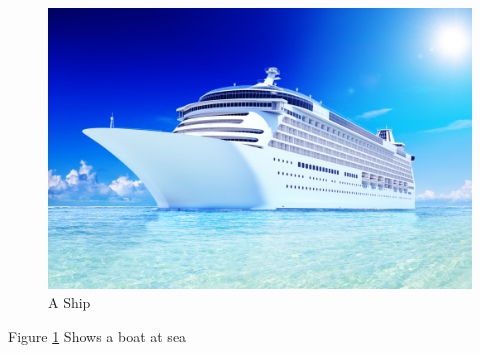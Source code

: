 \documentclass{article}
\begin{document}
	\begin{figure}
		\includegraphics[width=\linewidth]{boat.jpg}
		\caption{A Ship}
		\label{fig:boat}
	\end{figure}
	Figure  \ref{fig:boat} Shows a boat at sea
	
\end{document}
